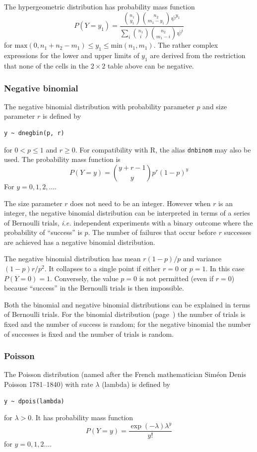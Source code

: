 \documentclass[11pt, a4paper, titlepage]{report}
\newcommand{\R}{\textsf{R}}
\begin{document}
{The hypergeometric distribution has probability mass function
\[
P(Y=y_1) = \frac{ {n_1 \choose y_1} {n_2 \choose m_1 - y_1} \psi^{y_1}}
{ \sum_i {n_1 \choose i} {n_2 \choose m_1 - i} \psi^i}
\]
for $\text{max}(0, n_1 + n_2 - m_1) \leq y_1 \leq
\text{min}(n_1,m_1)$.  The rather complex expressions for the lower
and upper limits of $y_1$ are derived from the restriction that none
of the cells in the $2 \times 2$ table above can be negative.

\subsubsection{Negative binomial}

The negative binomial distribution with probability parameter $p$
and size parameter $r$ is defined by
\begin{verbatim}
y ~ dnegbin(p, r)
\end{verbatim}
for $0 < p \leq 1$ and $r \geq 0$. For compatibility with \R, the
alias \texttt{dnbinom} may also be used. The probability mass function is
\[
P(Y=y) = {y + r -1 \choose y} p^r (1-p)^y
\]
For $y = 0, 1, 2, \ldots$.

The size parameter $r$ does not need to be an integer. However when
$r$ is an integer, the negative binomial distribution can be
interpreted in terms of a series of Bernoulli trials, {\em i.e.}
independent experiments with a binary outcome where the probability of
``success'' is $p$. The number of failures that occur before $r$
successes are achieved has a negative binomial distribution.

The negative binomial distribution has mean $r(1-p)/p$ and variance
$(1 - p)r/p^2$. It collapses to a single point if either $r=0$ or
$p=1$. In this case $P(Y=0) = 1$. Conversely, the value $p=0$ is not
permitted (even if $r=0$) because ``success'' in the Bernoulli trials
is then impossible.

Both the binomial and negative binomial distributions can be explained
in terms of Bernoulli trials. For the binomial distribution
(page~\pageref{bugs:dbin}) the number of trials is fixed and the number of
success is random; for the negative binomial the number of successes
is fixed and the number of trials is random.

\subsubsection{Poisson}

The Poisson distribution (named after the French mathematician
Sim\'{e}on Denis Poisson 1781--1840) with rate $\lambda$ (lambda) is
defined by
\begin{verbatim}
y ~ dpois(lambda)
\end{verbatim}
for $\lambda > 0$. It has probability mass function
\[
P(Y=y) = \frac{\textstyle \exp(-\lambda) \lambda^y}{\textstyle y!}
\]
for $y = 0, 1, 2 \ldots$.

}
\end{document}
